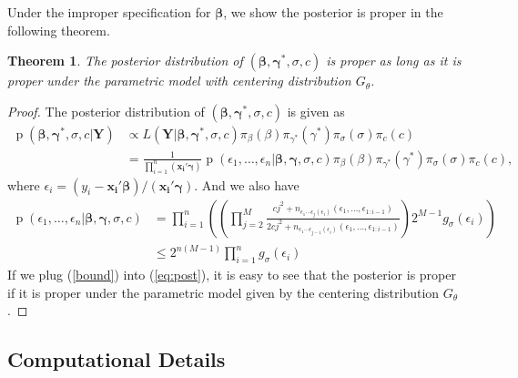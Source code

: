\documentclass[12pt]{article}
\newtheorem{thm}{Theorem}[section]
\DeclareMathOperator{\pr}{p}
\begin{document}
Under the improper specification for ${\bm{\beta}}$, we show the posterior is proper in the following theorem.

\begin{thm}
The posterior distribution of $(\bm{\beta}, \bm{\gamma^{*}}, \sigma, c)$ is proper as long as it is proper under the parametric model with centering distribution $G_{\theta}$.
\end{thm}

\begin{proof}
The posterior distribution of $(\bm{\beta}, \bm{\gamma^{*}}, \sigma, c)$ is given as
\begin{equation}\label{eq:post}
  \begin{aligned}
    \pr(\bm{\beta}, \bm{\gamma^{*}}, \sigma, c|\bm{Y}) & \propto L(\bm{Y}|
    \bm{\beta}, \bm{\gamma^{*}}, \sigma, c) \pi_{\beta}(\beta)
    \pi_{\gamma^{*}}(\gamma^{*}) \pi_{\sigma}(\sigma) \pi_c(c) \\
    & = \frac{1}{\prod_{i=1}^n (\bm{x_i\prime\gamma})} \pr \left(
      \epsilon_1, \ldots, \epsilon_n | \bm{\beta}, \bm{\gamma},
      \sigma, c\right) \pi_{\beta}(\beta)
    \pi_{\gamma^{*}}(\gamma^{*}) \pi_{\sigma}(\sigma) \pi_c(c),
  \end{aligned}
\end{equation}
where $\epsilon_i = (y_i - \bm{x_i\prime\beta})/(\bm{x_i\prime\gamma})$. And we also have
\begin{equation}\label{bound}
\begin{aligned}
\pr \left(\epsilon_1, \ldots, \epsilon_n | \bm{\beta}, \bm{\gamma}, \sigma, c\right) &
 = \prod_{i = 1}^{n} \left( \left(\prod_{j=2}^M \frac{cj^2 + n_{\epsilon_1 \cdots \epsilon_j(\epsilon_{i}) }(\epsilon_1, \ldots, \epsilon_{1:i-1})}{2cj^2+ n_{\epsilon_1 \cdots \epsilon_{j-1}(\epsilon_i)}(\epsilon_1, \ldots, \epsilon_{1:i-1})}    \right) 2^{M-1} g_{\sigma}(\epsilon_i) \right) \\
& \le 2^{n(M-1)} \prod_{i = 1}^n g_{\sigma}(\epsilon_i)
\end{aligned}
\end{equation}
If we plug (\ref{bound}) into (\ref{eq:post}), it is easy to see that the posterior is proper if it is proper under the parametric model given by the centering distribution $G_{\theta}$.
\end{proof}

\subsection{Computational Details}\label{ch2:sec:computation}
\end{document}
